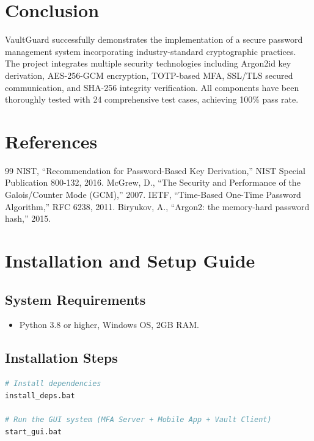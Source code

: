 \documentclass[12pt,a4paper]{report}
\begin{document}
\chapter{Conclusion}

VaultGuard successfully demonstrates the implementation of a secure password management system incorporating industry-standard cryptographic practices. The project integrates multiple security technologies including Argon2id key derivation, AES-256-GCM encryption, TOTP-based MFA, SSL/TLS secured communication, and SHA-256 integrity verification. All components have been thoroughly tested with 24 comprehensive test cases, achieving 100\% pass rate.

\chapter*{References}

\begin{thebibliography}{99}
 NIST, ``Recommendation for Password-Based Key Derivation,'' NIST Special Publication 800-132, 2016.
 McGrew, D., ``The Security and Performance of the Galois/Counter Mode (GCM),'' 2007.
 IETF, ``Time-Based One-Time Password Algorithm,'' RFC 6238, 2011.
 Biryukov, A., ``Argon2: the memory-hard password hash,'' 2015.
\end{thebibliography}

\appendix

\chapter{Installation and Setup Guide}

\section{System Requirements}
\begin{itemize}
    \item Python 3.8 or higher, Windows OS, 2GB RAM.
\end{itemize}

\section{Installation Steps}
\begin{lstlisting}[language=bash]
# Install dependencies
install_deps.bat

# Run the GUI system (MFA Server + Mobile App + Vault Client)
start_gui.bat
\end{lstlisting}
\end{document}
